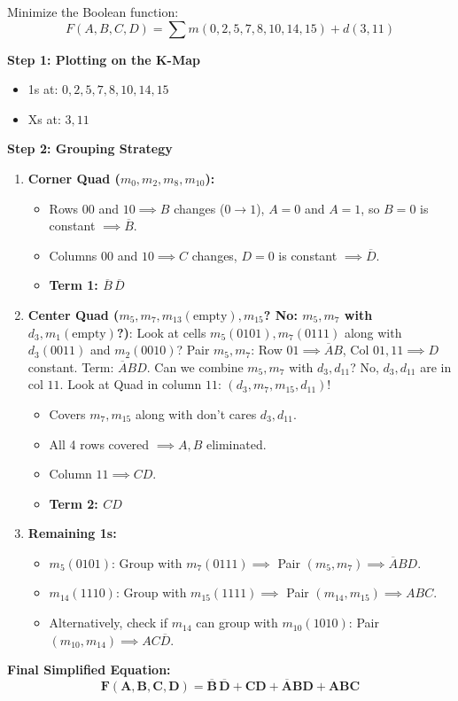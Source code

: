 \begin{example}
Minimize the Boolean function:
\begin{equation*}
    F(A,B,C,D) = \sum m(0, 2, 5, 7, 8, 10, 14, 15) + d(3, 11)
\end{equation*}

\tcblower
\textbf{Step 1: Plotting on the K-Map}
\begin{itemize}
    \item 1s at: $0, 2, 5, 7, 8, 10, 14, 15$
    \item Xs at: $3, 11$
\end{itemize}

\textbf{Step 2: Grouping Strategy}
\begin{enumerate}
    \item \textbf{Corner Quad ($m_0, m_2, m_8, m_{10}$):}
    \begin{itemize}
        \item Rows $00$ and $10 \implies B$ changes ($0 \rightarrow 1$), $A=0$ and $A=1$, so $B=0$ is constant $\implies \overline{B}$.
        \item Columns $00$ and $10 \implies C$ changes, $D=0$ is constant $\implies \overline{D}$.
        \item \textbf{Term 1: $\overline{B}\,\overline{D}$}
    \end{itemize}
    \item \textbf{Center Quad ($m_5, m_7, m_{13}(\text{empty}), m_{15}$? No: $m_5, m_7$ with $d_3, m_1(\text{empty})$?)}:
    Look at cells $m_5(0101), m_7(0111)$ along with $d_3(0011)$ and $m_2(0010)$?
    Pair $m_5, m_7$: Row $01 \implies \overline{A}B$, Col $01, 11 \implies D$ constant. Term: $\overline{A}BD$.
    Can we combine $m_5, m_7$ with $d_3, d_{11}$? No, $d_3, d_{11}$ are in col $11$.
    Look at Quad in column $11$: $(d_3, m_7, m_{15}, d_{11})$!
    \begin{itemize}
        \item Covers $m_7, m_{15}$ along with don't cares $d_3, d_{11}$.
        \item All 4 rows covered $\implies A, B$ eliminated.
        \item Column $11 \implies CD$.
        \item \textbf{Term 2: $CD$}
    \end{itemize}
    \item \textbf{Remaining 1s:}
    \begin{itemize}
        \item $m_5 (0101)$: Group with $m_7 (0111) \implies$ Pair $(m_5, m_7) \implies \overline{A}BD$.
        \item $m_{14} (1110)$: Group with $m_{15} (1111) \implies$ Pair $(m_{14}, m_{15}) \implies AB C$.
        \item Alternatively, check if $m_{14}$ can group with $m_{10} (1010)$: Pair $(m_{10}, m_{14}) \implies AC\overline{D}$.
    \end{itemize}
\end{enumerate}

\textbf{Final Simplified Equation:}
$$\mathbf{F(A,B,C,D) = \overline{B}\,\overline{D} + CD + \overline{A}BD + AB C}$$
\end{example}

